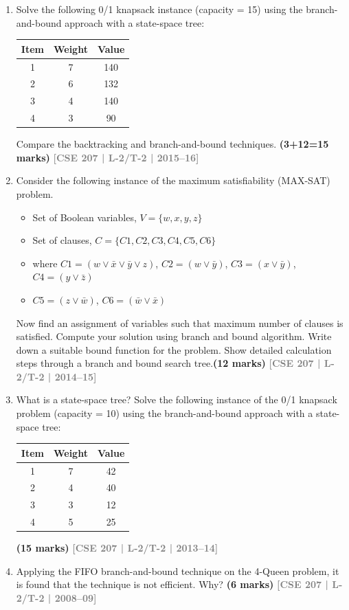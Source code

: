 \documentclass[12pt]{article}
\newcommand{\yr}[1]{\hfill\textcolor{gray}{\small\textbf{[#1]}}}
\newcommand{\mk}[1]{\textcolor{orange!70!black}{\small\textbf{(#1 marks)}}}
\begin{document}
\begin{enumerate}
\item Solve the following 0/1 knapsack instance (capacity = 15) using the branch-and-bound approach with a state-space tree:
\begin{center}
\begin{tabular}{ccc}
\toprule
Item & Weight & Value \\
\midrule
1 & 7 & 140 \\
2 & 6 & 132 \\
3 & 4 & 140 \\
4 & 3 & 90 \\
\bottomrule
\end{tabular}
\end{center}
Compare the backtracking and branch-and-bound techniques. \mk{3+12=15}
\yr{CSE 207 | L-2/T-2 | 2015--16}


\item Consider the following instance of the maximum satisfiability (MAX-SAT) problem.

\begin{itemize}
\item[] Set of Boolean variables, $V = \{w, x, y, z\}$
\item[] Set of clauses, $C = \{C1, C2, C3, C4, C5, C6\}$
\item[] where $C1 = (w \vee \bar{x} \vee \bar{y} \vee z)$, \quad
$C2 = (w \vee \bar{y})$, \quad
$C3 = (x \vee \bar{y})$, \quad
$C4 = (y \vee \bar{z})$
\item[] $C5 = (z \vee \bar{w})$, \quad
$C6 = (\bar{w} \vee \bar{x})$
\end{itemize}

\noindent
Now find an assignment of variables such that maximum number of clauses is satisfied.
Compute your solution using branch and bound algorithm. Write down a suitable bound
function for the problem. Show detailed calculation steps through a branch and bound
search tree.\mk{12}
\yr{CSE 207 | L-2/T-2 | 2014--15}


\item What is a state-space tree? Solve the following instance of the 0/1 knapsack problem (capacity = 10) using the branch-and-bound approach with a state-space tree:
\begin{center}
\begin{tabular}{ccc}
\toprule
Item & Weight & Value \\
\midrule
1 & 7 & 42 \\
2 & 4 & 40 \\
3 & 3 & 12 \\
4 & 5 & 25 \\
\bottomrule
\end{tabular}
\end{center}
\mk{15}
\yr{CSE 207 | L-2/T-2 | 2013--14}


\item Applying the FIFO branch-and-bound technique on the 4-Queen problem, it is found that the technique is not efficient. Why? \mk{6}
\yr{CSE 207 | L-2/T-2 | 2008--09}


\end{enumerate}
\end{document}
